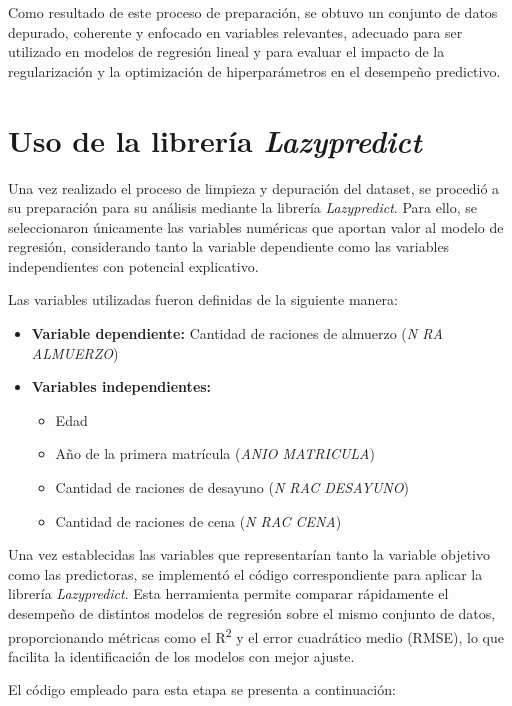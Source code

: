 \documentclass{article}
\begin{document}
Como resultado de este proceso de preparación, se obtuvo un conjunto de datos depurado, coherente y enfocado en variables relevantes, adecuado para ser utilizado en modelos de regresión lineal y para evaluar el impacto de la regularización y la optimización de hiperparámetros en el desempeño predictivo.

\section{Uso de la librería \textit{Lazypredict}}

Una vez realizado el proceso de limpieza y depuración del dataset, se procedió a su preparación para su análisis mediante la librería \textit{Lazypredict}. Para ello, se seleccionaron únicamente las variables numéricas que aportan valor al modelo de regresión, considerando tanto la variable dependiente como las variables independientes con potencial explicativo.

Las variables utilizadas fueron definidas de la siguiente manera:

\begin{itemize}
    \item \textbf{Variable dependiente:} Cantidad de raciones de almuerzo (\textit{N RA ALMUERZO})
    \item \textbf{Variables independientes:}
    \begin{itemize}
        \item Edad
        \item Año de la primera matrícula (\textit{ANIO MATRICULA})
        \item Cantidad de raciones de desayuno (\textit{N RAC DESAYUNO})
        \item Cantidad de raciones de cena (\textit{N RAC CENA})
    \end{itemize}
\end{itemize}

Una vez establecidas las variables que representarían tanto la variable objetivo como las predictoras, se implementó el código correspondiente para aplicar la librería \textit{Lazypredict}. Esta herramienta permite comparar rápidamente el desempeño de distintos modelos de regresión sobre el mismo conjunto de datos, proporcionando métricas como el R\textsuperscript{2} y el error cuadrático medio (RMSE), lo que facilita la identificación de los modelos con mejor ajuste.

El código empleado para esta etapa se presenta a continuación:
\end{document}
